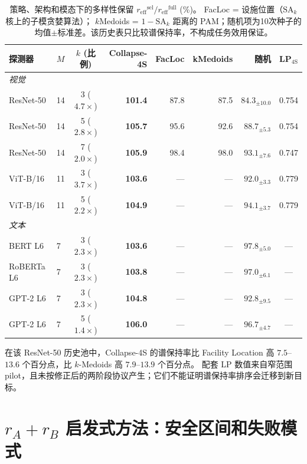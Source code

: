 \documentclass{article}
\newcommand{\reff}{\ensuremath{r_{\mathrm{eff}}}\xspace}
\newcommand{\SAk}{\ensuremath{\mathrm{SA}_k}\xspace}
\begin{document}
\begin{table}[h]
\centering
\caption{策略、架构和模态下的多样性保留 $\reff^{\mathrm{sel}}/\reff^{\mathrm{full}}$ (\%)。
FacLoc = 设施位置（$\SAk$ 核上的子模贪婪算法）；
$k$Medoids = $1{-}\SAk$ 距离的 PAM；随机项为10次种子的均值$\pm$标准差。该历史表只比较谱保持率，不构成任务效用保证。}
\label{tab:compression}
\small
\setlength{\tabcolsep}{2.5pt}
\begin{tabular}{llcrrrrc}
\toprule
探测器 & $M$ & $k$ (比例) & Collapse-4S & FacLoc & kMedoids & 随机 & LP$_{\mathrm{4S}}$ \\
\midrule
\multicolumn{8}{l}{\textit{视觉}} \\
ResNet-50 & 14 & 3 ($4.7{\times}$) & \textbf{101.4} & 87.8 & 87.5 & $84.3_{\pm10.0}$ & 0.754 \\
ResNet-50 & 14 & 5 ($2.8{\times}$) & \textbf{105.7} & 95.6 & 92.6 & $88.7_{\pm5.3}$ & 0.754 \\
ResNet-50 & 14 & 7 ($2.0{\times}$) & \textbf{105.9} & 98.4 & 98.0 & $93.1_{\pm7.6}$ & 0.747 \\
ViT-B/16  & 11 & 3 ($3.7{\times}$) & \textbf{103.6} & ---  & ---   & $92.0_{\pm3.3}$ & 0.779 \\
ViT-B/16  & 11 & 5 ($2.2{\times}$) & \textbf{104.9} & ---  & ---   & $94.1_{\pm3.7}$ & 0.779 \\
\midrule
\multicolumn{8}{l}{\textit{文本}} \\
BERT L6    & 7 & 3 ($2.3{\times}$) & \textbf{103.6} & ---  & ---   & $97.8_{\pm5.0}$ & --- \\
RoBERTa L6 & 7 & 3 ($2.3{\times}$) & \textbf{103.8} & ---  & ---   & $97.0_{\pm6.1}$ & --- \\
GPT-2 L6   & 7 & 3 ($2.3{\times}$) & \textbf{104.8} & ---  & ---   & $92.8_{\pm9.5}$ & --- \\
GPT-2 L6   & 7 & 5 ($1.4{\times}$) & \textbf{106.0} & ---  & ---   & $96.7_{\pm4.7}$ & --- \\
\bottomrule
\end{tabular}\normalsize
\end{table}
在该 ResNet-50 历史池中，Collapse-4S 的谱保持率比 Facility Location 高
$7.5$--$13.6$ 个百分点，比 $k$-Medoids 高 $7.9$--$13.9$ 个百分点。
配套 LP 数值来自窄范围 pilot，且未按修正后的两阶段协议产生；它们不能证明谱保持率排序会迁移到新目标。

\section{$r_A{+}r_B$ 启发式方法：安全区间和失败模式}
\label{app:rsum_regime}
\end{document}
